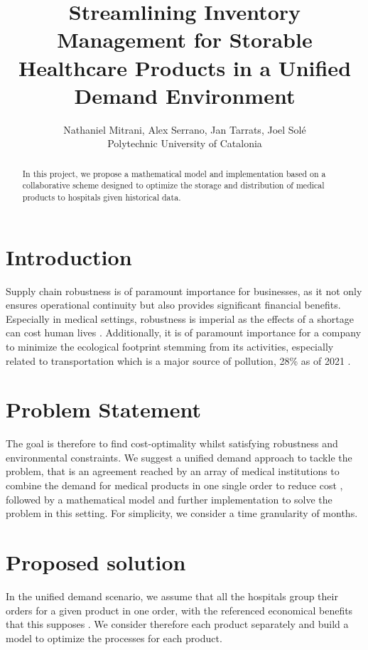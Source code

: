 \documentclass[11pt,twocolumn]{article}
\begin{document}
\title{Streamlining Inventory Management for Storable Healthcare Products in a Unified Demand Environment}

\author{Nathaniel Mitrani, Alex Serrano, Jan Tarrats, Joel Solé\\ Polytechnic University of Catalonia}

\maketitle

\begin{abstract}
	In this project, we propose a mathematical model and implementation based on a collaborative scheme designed to optimize the storage and distribution of medical products to hospitals given historical data.
\end{abstract}

\section{Introduction}\label{sec1}
Supply chain robustness is of paramount importance for businesses, as it not only ensures operational continuity but also provides significant financial benefits. Especially in medical settings, robustness is imperial as the effects of a shortage can cost human lives \cite{key3}.
Additionally, it is of paramount importance for a company to minimize the ecological footprint stemming from its activities, especially related to transportation which is a major source of pollution, 28\% as of 2021 \cite{key1}.

\section{Problem Statement}\label{sec2}
The goal is therefore to find cost-optimality whilst satisfying robustness and environmental constraints. We suggest a unified demand approach to tackle the problem, that is an agreement reached by an array of medical institutions to combine the demand for medical products in one single order to reduce cost \cite{key2}, followed by a mathematical model and further implementation to solve the problem in this setting. For simplicity, we consider a time granularity of months.

\section{Proposed solution}\label{sec3}
In the unified demand scenario, we assume that all the hospitals group their orders for a given product in one order, with the referenced economical benefits that this supposes \cite{key2}. We consider therefore each product separately and build a model to optimize the processes for each product.
\end{document}
